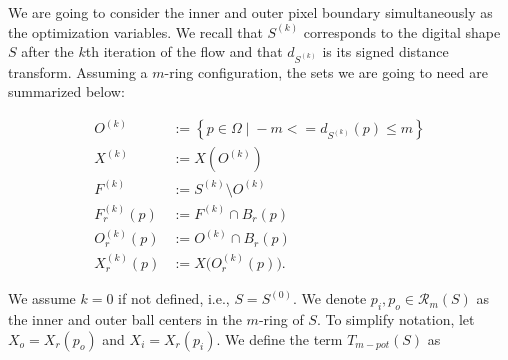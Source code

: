 %
%
%
%
%
%
%



We are going to consider the inner and outer pixel boundary simultaneously as the optimization variables. We recall that $S^{(k)}$ corresponds to the digital shape $S$ after the $k$th iteration of the flow and that $d_{S^{(k)}}$ is its signed distance transform. Assuming a $m$-ring configuration, the sets we are going to need are summarized below:

\begin{align*}
	O^{(k)} &:=\left\{ p \in \Omega \; | \; -m <= d_{S^{(k)}}(p) \leq m \right\}\\
	X^{(k)} &:= X(O^{(k)})  \\
	F^{(k)} &:= S^{(k)} \setminus O^{(k)} \\
	F_r^{(k)}(p) &:= F^{(k)} \cap B_r(p)\\
	O_r^{(k)}(p) &:= O^{(k)} \cap B_r(p) \\
	X_r^{(k)}(p) &:= X\big( O_r^{(k)}(p) \big).
\end{align*}

We assume $k=0$ if not defined, i.e., $S=S^{(0)}$. We denote $p_i, p_o \in \mathcal{R}_m(S)$ as the inner and outer ball centers in the $m$-ring of $S$. To simplify notation, let $X_o=X_r(p_o)$ and $X_i=X_r(p_i)$. We define the term $T_{m-pot}(S)$ as


